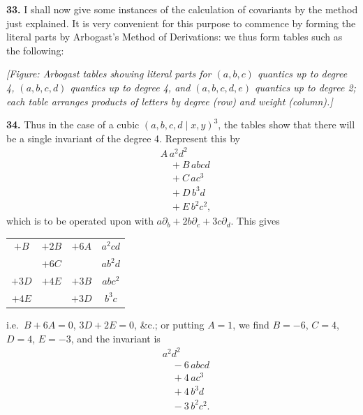 \documentclass[11pt]{article}
\begin{document}
\textbf{33.} I shall now give some instances of the calculation of covariants by the method just explained. It is very convenient for this purpose to commence by forming the literal parts by Arbogast's Method of Derivations: we thus form tables such as the following:

\textit{[Figure: Arbogast tables showing literal parts for $(a, b, c)$ quantics up to degree 4, $(a, b, c, d)$ quantics up to degree 4, and $(a, b, c, d, e)$ quantics up to degree 2; each table arranges products of letters by degree (row) and weight (column).]}

\textbf{34.} Thus in the case of a cubic $(a, b, c, d \mid x, y)^3$, the tables show that there will be a single invariant of the degree 4. Represent this by
\begin{align*}
&A\,a^2 d^2 \\
&\quad + B\,abcd \\
&\quad + C\,ac^3 \\
&\quad + D\,b^3 d \\
&\quad + E\,b^2 c^2,
\end{align*}
which is to be operated upon with $a\partial_b + 2b\partial_c + 3c\partial_d$. This gives
\begin{center}
\begin{tabular}{cccc}
$+ B$ & $+ 2 B$ & $+ 6 A$ & $a^2 cd$ \\
        & $+ 6 C$ &         & $a b^2 d$ \\
$+ 3 D$ & $+ 4 E$ & $+ 3 B$ & $abc^2$ \\
$+ 4 E$ &         & $+ 3 D$ & $b^3 c$ \\
\end{tabular}
\end{center}
i.e.\ $B + 6 A = 0$, $3 D + 2 E = 0$, \&c.; or putting $A = 1$, we find $B = -6$, $C = 4$, $D = 4$, $E = -3$, and the invariant is
\begin{align*}
&a^2 d^2 \\
&\quad - 6\,abcd \\
&\quad + 4\,ac^3 \\
&\quad + 4\,b^3 d \\
&\quad - 3\,b^2 c^2.
\end{align*}
\end{document}
